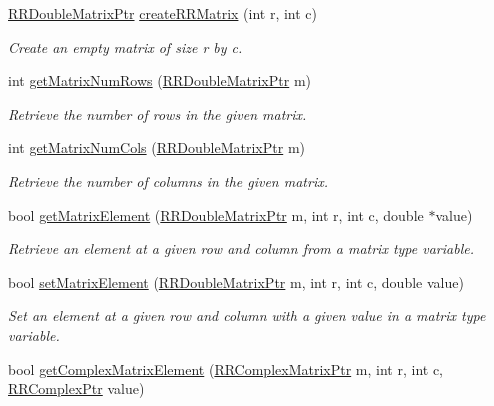 \begin{DoxyCompactItemize}
\hyperlink{rrc__types_8h_ae586a879d30f0823087e42d93464b5dd}{R\+R\+Double\+Matrix\+Ptr} \hyperlink{group__helper_routines_gaf462e87fffe618001f9a090db897b014}{create\+R\+R\+Matrix} (int r, int c)
\begin{DoxyCompactList}\small\item\em Create an empty matrix of size r by c. \end{DoxyCompactList}\item 
int \hyperlink{group__helper_routines_gace79da82f227142b2b12203eb90b39c2}{get\+Matrix\+Num\+Rows} (\hyperlink{rrc__types_8h_ae586a879d30f0823087e42d93464b5dd}{R\+R\+Double\+Matrix\+Ptr} m)
\begin{DoxyCompactList}\small\item\em Retrieve the number of rows in the given matrix. \end{DoxyCompactList}\item 
int \hyperlink{group__helper_routines_ga48c14f12ed0903649369318daa595c16}{get\+Matrix\+Num\+Cols} (\hyperlink{rrc__types_8h_ae586a879d30f0823087e42d93464b5dd}{R\+R\+Double\+Matrix\+Ptr} m)
\begin{DoxyCompactList}\small\item\em Retrieve the number of columns in the given matrix. \end{DoxyCompactList}\item 
bool \hyperlink{group__helper_routines_gaaaeee435626a35220ef9329964633356}{get\+Matrix\+Element} (\hyperlink{rrc__types_8h_ae586a879d30f0823087e42d93464b5dd}{R\+R\+Double\+Matrix\+Ptr} m, int r, int c, double $\ast$value)
\begin{DoxyCompactList}\small\item\em Retrieve an element at a given row and column from a matrix type variable. \end{DoxyCompactList}\item 
bool \hyperlink{group__helper_routines_gab8c7891563c13c1e59fc65251d4a19d7}{set\+Matrix\+Element} (\hyperlink{rrc__types_8h_ae586a879d30f0823087e42d93464b5dd}{R\+R\+Double\+Matrix\+Ptr} m, int r, int c, double value)
\begin{DoxyCompactList}\small\item\em Set an element at a given row and column with a given value in a matrix type variable. \end{DoxyCompactList}\item 
bool \hyperlink{group__helper_routines_ga881e667ad97b6c4461bf54c3a265f395}{get\+Complex\+Matrix\+Element} (\hyperlink{rrc__types_8h_a8cf9e865d8541d100f153800adbb7c3f}{R\+R\+Complex\+Matrix\+Ptr} m, int r, int c, \hyperlink{rrc__types_8h_ada2046d7326c56ae29d8510fbf6622ee}{R\+R\+Complex\+Ptr} value)

\end{DoxyCompactItemize}
